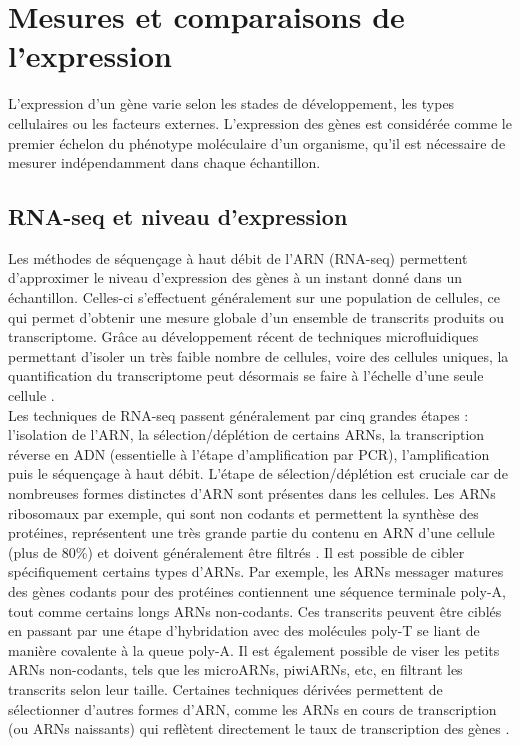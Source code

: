 \section{Mesures et comparaisons de l’expression}
\label{sec:mesure-et-comparaison}

L’expression d’un gène varie selon les stades de développement, les types cellulaires ou les facteurs externes. L’expression des gènes est considérée comme le premier échelon du phénotype moléculaire d’un organisme, qu’il est nécessaire de mesurer indépendamment dans chaque échantillon.

\subsection{RNA-seq et niveau d’expression}
\label{subsec:RNAseq-niveau-expression}
Les méthodes de séquençage à haut débit de l’\acrshort{ARN} (\acrshort{RNA-seq}) permettent d’approximer le niveau d’expression des gènes à un instant donné dans un échantillon. Celles-ci s’effectuent généralement sur une population de cellules, ce qui permet d’obtenir une mesure globale d’un ensemble de transcrits produits ou transcriptome. Grâce au développement récent de techniques microfluidiques permettant d’isoler un très faible nombre de cellules, voire des cellules uniques, la quantification du transcriptome peut désormais se faire à l’échelle d’une seule cellule \citep{tang_mrna-seq_2009}. 
 \\

Les techniques de \acrshort{RNA-seq} passent généralement par cinq grandes étapes : l’isolation de l’\acrshort{ARN}, la sélection/déplétion de certains \acrshort{ARN}s, la transcription réverse en \acrshort{ADN} (essentielle à l’étape d’amplification par PCR), l’amplification puis le séquençage à haut débit. L’étape de sélection/déplétion est cruciale car de nombreuses formes distinctes d’\acrshort{ARN} sont présentes dans les cellules. Les \acrshort{ARN}s ribosomaux par exemple, qui sont non codants et permettent la synthèse des protéines, représentent une très grande partie du contenu en \acrshort{ARN} d’une cellule (plus de 80\%) et doivent généralement être filtrés \citep{oneil_ribosomal_2013}. Il est possible de cibler spécifiquement certains types d'\acrshort{ARN}s. Par exemple, les \acrshort{ARN}s messager matures des gènes codants pour des protéines contiennent une séquence terminale poly-A, tout comme certains longs \acrshort{ARN}s non-codants. Ces transcrits peuvent être ciblés en passant par une étape d'hybridation avec des molécules poly-T se liant de manière covalente à la queue poly-A. Il est également possible de viser les petits \acrshort{ARN}s non-codants, tels que les micro\acrshort{ARN}s, piwi\acrshort{ARN}s, etc, en filtrant les transcrits selon leur taille. Certaines techniques dérivées permettent de sélectionner d’autres formes d’\acrshort{ARN}, comme les \acrshort{ARN}s en cours de transcription (ou \acrshort{ARN}s naissants) qui reflètent directement le taux de transcription des gènes \citep{core_nascent_2008}. 

